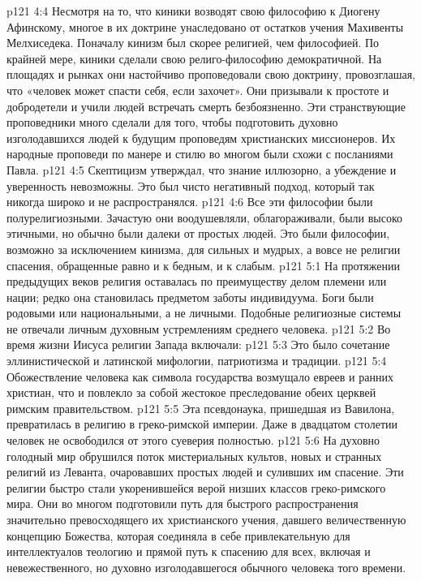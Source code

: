 \vs p121 4:4 \bibnobreakspace {} Несмотря на то, что киники возводят свою философию к Диогену Афинскому, многое в их доктрине унаследовано от остатков учения Махивенты Мелхиседека. Поначалу кинизм был скорее религией, чем философией. По крайней мере, киники сделали свою религо\hyp{}философию демократичной. На площадях и рынках они настойчиво проповедовали свою доктрину, провозглашая, что «человек может спасти себя, если захочет». Они призывали к простоте и добродетели и учили людей встречать смерть безбоязненно. Эти странствующие проповедники много сделали для того, чтобы подготовить духовно изголодавшихся людей к будущим проповедям христианских миссионеров. Их народные проповеди по манере и стилю во многом были схожи с посланиями Павла.
\vs p121 4:5 \bibnobreakspace {} Скептицизм утверждал, что знание иллюзорно, а убеждение и уверенность невозможны. Это был чисто негативный подход, который так никогда широко и не распространялся.
\vs p121 4:6 \pc Все эти философии были полурелигиозными. Зачастую они воодушевляли, облагораживали, были высоко этичными, но обычно были далеки от простых людей. Это были философии, возможно за исключением кинизма, для сильных и мудрых, а вовсе не религии спасения, обращенные равно и к бедным, и к слабым.
\vs p121 5:1 На протяжении предыдущих веков религия оставалась по преимуществу делом племени или нации; редко она становилась предметом заботы индивидуума. Боги были родовыми или национальными, а не личными. Подобные религиозные системы не отвечали личным духовным устремлениям среднего человека.
\vs p121 5:2 Во время жизни Иисуса религии Запада включали:
\vs p121 5:3 \bibnobreakspace {} Это было сочетание эллинистической и латинской мифологии, патриотизма и традиции.
\vs p121 5:4 \bibnobreakspace {} Обожествление человека как символа государства возмущало евреев и ранних христиан, что и повлекло за собой жестокое преследование обеих церквей римским правительством.
\vs p121 5:5 \bibnobreakspace {} Эта псевдонаука, пришедшая из Вавилона, превратилась в религию в греко\hyp{}римской империи. Даже в двадцатом столетии человек не освободился от этого суеверия полностью.
\vs p121 5:6 \bibnobreakspace {} На духовно голодный мир обрушился поток мистериальных культов, новых и странных религий из Леванта, очаровавших простых людей и суливших им  спасение. Эти религии быстро стали укоренившейся верой низших классов греко\hyp{}римского мира. Они во многом подготовили путь для быстрого распространения значительно превосходящего их христианского учения, давшего величественную концепцию Божества, которая соединяла в себе привлекательную для интеллектуалов теологию и прямой путь к спасению для всех, включая и невежественного, но духовно изголодавшегося обычного человека того времени.
